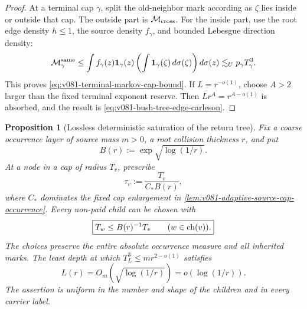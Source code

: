 \documentclass[10pt]{article}
\newtheorem{proposition}[theorem]{Proposition}
\begin{document}
\begin{proof}
At a terminal cap \(\gamma\), split the old-neighbor mark according as \(\zeta\) lies inside or
outside that cap.  The outside part is \(\mathcal M_{\rm cross}\).  For the inside part, use the
root edge density \(h\le1\), the source density \(f_\gamma\), and bounded Lebesgue direction
density:
\[
\mathcal M_\gamma^{\rm same}
\le
\int f_\gamma(z)\mathbf1_\gamma(z)
\left(\int\mathbf1_\gamma(\zeta)\,d\sigma(\zeta)\right)d\sigma(z)
\lesssim_U p_\gamma T_\gamma^3.
\]
This proves \eqref{eq:v081-terminal-markov-cap-bound}.  If \(L=r^{-o(1)}\), choose \(A>2\)
larger than the fixed terminal exponent reserve.  Then \(Lr^A=r^{A-o(1)}\) is absorbed, and the
result is \eqref{eq:v081-bush-tree-edge-carleson}.
\end{proof}

\begin{proposition}[Lossless deterministic saturation of the return tree]
\label{prop:v081-lossless-cap-saturation}
Fix a coarse occurrence layer of source mass \(m>0\), a root collision thickness \(r\), and put
\[
B(r):=\exp\!\sqrt{\log(1/r)}.
\]
At a node in a cap of radius \(T_v\), prescribe
\[
\tau_v:=\frac{T_v}{C_*B(r)},
\]
where \(C_*\) dominates the fixed cap enlargement in
\cref{lem:v081-adaptive-source-cap-occurrence}.  Every non-paid child can be chosen with
\begin{equation}
\label{eq:v081-deterministic-cap-contraction}
\boxed{T_w\le B(r)^{-1}T_v\qquad(w\in{\rm ch}(v)).}
\end{equation}
The choices preserve the entire absolute occurrence measure and all inherited marks.  The least
depth at which \(T_L^3\le mr^{2-o(1)}\) satisfies
\begin{equation}
\label{eq:v081-deterministic-saturation-depth}
\boxed{L(r)=O_m\!\left(\sqrt{\log(1/r)}\right)=o(\log(1/r)).}
\end{equation}
The assertion is uniform in the number and shape of the children and in every carrier label.
\end{proposition}
\end{document}

